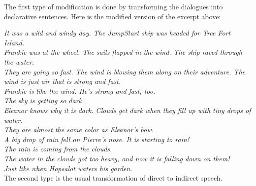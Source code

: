 The first type of modification is done by transforming the dialogues into declarative sentences. Here is the modified version of the excerpt above:

	\noindent
	\hspace{1 in}\emph{It was a wild and windy day. The JumpStart ship was headed for Tree Fort Island.} \\
	\hspace*{1 in}\emph{Frankie was at the wheel. The sails flapped in the wind. The ship raced through the water.} \\
	\hspace*{1 in}\emph{They are going so fast. The wind is blowing them along on their adventure. The wind is just air that is strong and fast.} \\
	\hspace*{1 in}\emph{Frankie is like the wind. He's strong and fast, too.} \\
	\hspace*{1 in}\emph{The sky is getting so dark.}\\
	\hspace*{1 in}\emph{Eleanor knows why it is dark. Clouds get dark when they fill up with tiny drops of water.} \\
	\hspace*{1 in}\emph{They are almost the same color as Eleanor's bow.} \\
	\hspace*{1 in}\emph{A big drop of rain fell on Pierre's nose. It is starting to rain!} \\
	\hspace*{1 in}\emph{The rain is coming from the clouds.} \\
	\hspace*{1 in}\emph{The water in the clouds got too heavy, and now it is falling down on them!} \\
	\hspace*{1 in}\emph{Just like when Hopsalot waters his garden.} \\

The second type is the usual transformation of direct to indirect speech. 

